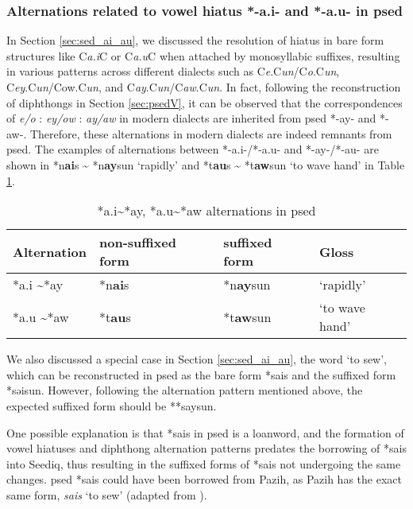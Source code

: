 \subsubsection{Alternations related to vowel hiatus *-a.i- and *-a.u- in \acl{psed}}

In Section \ref{sec:sed_ai_au}, we discussed the resolution of hiatus in bare form structures like C\textit{a.i}C or C\textit{a.u}C when attached by monosyllabic suffixes, resulting in various patterns across different dialects such as C\textit{e}.C\textit{un}/C\textit{o}.C\textit{un}, C\textit{ey}.C\textit{un}/Cow.C\textit{un}, and C\textit{ay}.C\textit{un}/C\textit{aw}.C\textit{un}. In fact, following the reconstruction of diphthongs in Section \ref{sec:psedV}, it can be observed that the correspondences of \textit{e/o} : \textit{ey/ow} : \textit{ay/aw} in modern dialects are inherited from \acl{psed} *-ay- and *-aw-. Therefore, these alternations in modern dialects are indeed remnants from \acl{psed}. The examples of alternations between *-a.i-/*-a.u- and *-ay-/*-au- are shown in *n\textbf{ai}s \~{} *n\textbf{ay}sun `rapidly' and *t\textbf{au}s \~{} *t\textbf{aw}sun `to wave hand' in Table \ref{tab:psed_ai_au}.

\begin{table}[!htbp]
\centering
\caption{*a.i\~{}*ay, *a.u\~{}*aw alternations in \acl{psed}}
\label{tab:psed_ai_au}
\begin{tabular}{llll}
\hline
Alternation        & non-suffixed form    & suffixed form & Gloss     \\ \hline
*a.i \~{ }*ay      & *n\textbf{ai}s & *n\textbf{ay}sun     & `rapidly' \\
*a.u \~{ }*aw      & *t\textbf{au}s & *t\textbf{aw}sun     & `to wave hand'   \\ \hline
\end{tabular}
\end{table}

We also discussed a special case in Section \ref{sec:sed_ai_au}, the word `to sew', which can be reconstructed in \acl{psed} as the bare form *sais and the suffixed form *səisun. However, following the alternation pattern mentioned above, the expected suffixed form should be **saysun.

One possible explanation is that *sais in \acl{psed} is a loanword, and the formation of vowel hiatuses and diphthong alternation patterns predates the borrowing of *sais into Seediq, thus resulting in the suffixed forms of *sais not undergoing the same changes. \acl{psed} *sais could have been borrowed from Pazih, as Pazih has the exact same form, \textit{sais} `to sew' (adapted from \cite{liandtsuchida2001paz}).

